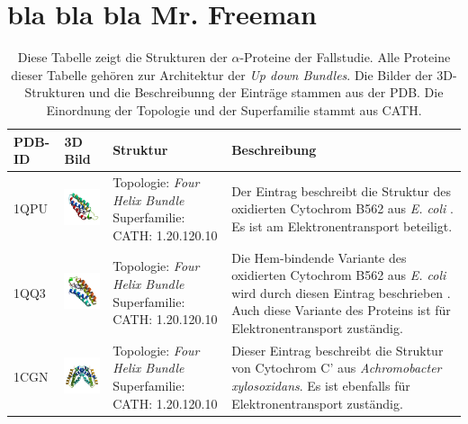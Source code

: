 \documentclass{article}
\begin{document}
\section{bla bla bla Mr. Freeman}

\begin{table}
\begin{center}


\caption{Diese Tabelle zeigt die Strukturen der $\alpha$-Proteine der Fallstudie. Alle Proteine dieser Tabelle geh\"oren zur Architektur der \textit{Up down Bundles}. Die Bilder der 3D-Strukturen und die Beschreibunng der Eintr\"age stammen aus der PDB. Die Einordnung der Topologie und der Superfamilie stammt aus CATH. }
\begin{tabular}{ | C{9mm} | C{30mm} | C{29mm} | C{38mm} | }
\hline
PDB-ID & 3D Bild & Struktur & Beschreibung \\ \hline
1QPU  & \includegraphics[width=30mm, trim= -10 -5 -5 -10]{1QPU_asym_r_500.jpg} & Topologie: \newline \textit{Four Helix Bundle} \newline Superfamilie: CATH: 1.20.120.10 & Der Eintrag beschreibt die Struktur des oxidierten Cytochrom B562 aus \textit{E. coli} \cite{1qpu}. Es ist am Elektronentransport beteiligt. \\ \hline
1QQ3  & \includegraphics[width=30mm, trim= -10 -5 -5 -10]{1QQ3_asym_r_500.jpg} & Topologie: \newline \textit{Four Helix Bundle} \newline Superfamilie: CATH: 1.20.120.10  & Die Hem-bindende Variante des oxidierten Cytochrom B562 aus \textit{E. coli} wird durch diesen Eintrag beschrieben \cite{1qq3}. Auch diese Variante des Proteins ist f\"ur Elektronentransport zust\"andig. \\ \hline
1CGN  & \includegraphics[width=30mm, trim= -10 -5 -5 -10]{1CGN_bio_r_500.jpg} & Topologie: \newline \textit{Four Helix Bundle} \newline Superfamilie: CATH: 1.20.120.10  & Dieser Eintrag beschreibt die Struktur von Cytochrom C' \cite{1cgn} aus \textit{Achromobacter xylosoxidans}. Es ist ebenfalls f\"ur Elektronentransport zust\"andig. \\ \hline

\end{tabular}
\end{center}
\end{table}
\end{document}
